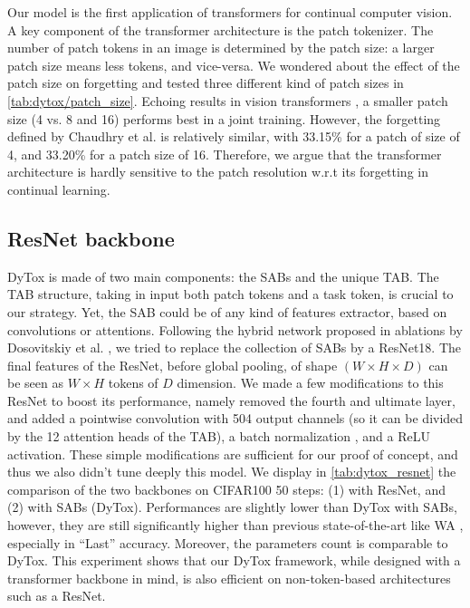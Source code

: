 Our model is the first application of transformers for continual computer vision. A key component of
the transformer architecture is the patch tokenizer. The number of patch tokens in an image is
determined by the patch size: a larger patch size means less tokens, and vice-versa. We wondered
about the effect of the patch size on forgetting and tested three different kind of patch sizes in
\autoref{tab:dytox/patch_size}. Echoing results in vision transformers
\cite{dosovitskiy2020vit,touvron2021deit}, a smaller patch size (4 vs. 8 and 16) performs best in a
joint training. However, the forgetting defined by Chaudhry et al.
\cite{chaudhry2018riemannien_walk} is relatively similar, with 33.15\% for a patch of size of 4, and
33.20\% for a patch size of 16. Therefore, we argue that the transformer architecture is hardly
sensitive to the patch resolution w.r.t its forgetting in continual learning.



%   

\subsection{ResNet backbone}

DyTox is made of two main components: the SABs and the unique TAB. The TAB structure, taking in
input both patch tokens and a task token, is crucial to our strategy. Yet, the SAB could be of any
kind of features extractor, based on convolutions or attentions. Following the hybrid network
proposed in ablations by Dosovitskiy et al. \cite{dosovitskiy2020vit}, we tried to replace the
collection of SABs by a ResNet18. The final features of the ResNet, before global pooling, of shape
$(W \times H \times D)$ can be seen as $W \times H$ tokens of $D$ dimension. We made a few
modifications to this ResNet to boost its performance, namely removed the fourth and ultimate layer,
and added a pointwise convolution with 504 output channels (so it can be divided by the 12 attention
heads of the TAB), a batch normalization \cite{ioffe2015batchnorm}, and a ReLU activation. These
simple modifications are sufficient for our proof of concept, and thus we also didn't tune deeply
this model. We display in \autoref{tab:dytox_resnet} the comparison of the two backbones on CIFAR100 50
steps: (1) with ResNet, and (2) with SABs (DyTox). Performances are slightly lower than DyTox with
SABs, however, they are still significantly higher than previous state-of-the-art like WA
\cite{zhao2020weightalignement}, especially in ``Last'' accuracy. Moreover, the parameters count is
comparable to DyTox. This experiment shows that our DyTox framework, while designed with a
transformer backbone in mind, is also efficient on non-token-based architectures such as a ResNet.

